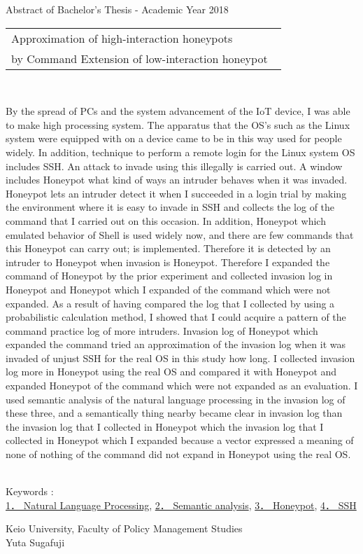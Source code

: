 Abstract of Bachelor's Thesis - Academic Year 2018
\begin{center}
\begin{large}
\begin{tabular}{|M{0.97\linewidth}|}
    \hline
        Approximation of high-interaction honeypots\\
        by Command Extension of low-interaction honeypot\\
    \hline
\end{tabular}
\end{large}
\end{center}

~ \\
\renewcommand{\baselinestretch}{0.9}

By the spread of PCs and the system advancement of the IoT device, I was able to make high processing system. The apparatus that the OS's such as the Linux system were equipped with on a device came to be in this way used for people widely. In addition, technique to perform a remote login for the Linux system OS includes SSH. An attack to invade using this illegally is carried out.
A window includes Honeypot what kind of ways an intruder behaves when it was invaded. Honeypot lets an intruder detect it when I succeeded in a login trial by making the environment where it is easy to invade in SSH and collects the log of the command that I carried out on this occasion. In addition, Honeypot which emulated behavior of Shell is used widely now, and there are few commands that this Honeypot can carry out; is implemented. Therefore it is detected by an intruder to Honeypot when invasion is Honeypot. Therefore I expanded the command of Honeypot by the prior experiment and collected invasion log in Honeypot and Honeypot which I expanded of the command which were not expanded. As a result of having compared the log that I collected by using a probabilistic calculation method, I showed that I could acquire a pattern of the command practice log of more intruders. Invasion log of Honeypot which expanded the command tried an approximation of the invasion log when it was invaded of unjust SSH for the real OS in this study how long. I collected invasion log more in Honeypot using the real OS and compared it with Honeypot and expanded Honeypot of the command which were not expanded as an evaluation. I used semantic analysis of the natural language processing in the invasion log of these three, and a semantically thing nearby became clear in invasion log than the invasion log that I collected in Honeypot which the invasion log that I collected in Honeypot which I expanded because a vector expressed a meaning of none of nothing of the command did not expand in Honeypot using the real OS.

\renewcommand{\baselinestretch}{1.0}

~ \\
Keywords : \\
\underline{1． Natural Language Processing},
\underline{2． Semantic analysis},
\underline{3． Honeypot},
\underline{4． SSH}
\begin{flushright}
Keio University, Faculty of Policy Management Studies\\
Yuta Sugafuji
\end{flushright}

